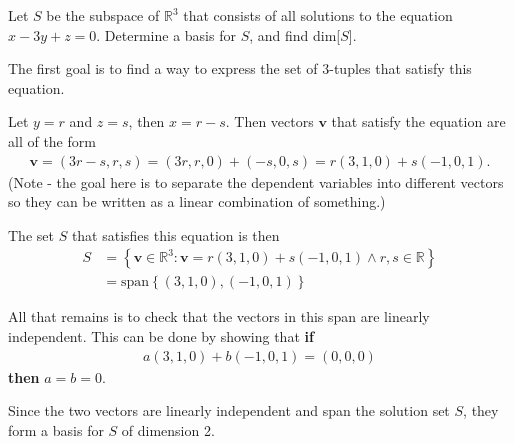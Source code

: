\begin{problem}[?]

Let \(S\) be the subspace of \(\mathbb{R}^3\) that consists of all
solutions to the equation \(x-3y+z = 0\). Determine a basis for \(S\),
and find dim{[}\(S\){]}.

\end{problem}

\begin{solution}

The first goal is to find a way to express the set of 3-tuples that
satisfy this equation.

Let \(y=r\) and \(z=s\), then \(x=r-s\). Then vectors \(\mathbf{v}\)
that satisfy the equation are all of the form
\begin{align*}
\mathbf{v} = (3r-s, r, s) = (3r,r,0)+(-s,0,s) = r(3,1,0) + s(-1,0,1).
\end{align*} (Note - the goal here is to separate the dependent
variables into different vectors so they can be written as a linear
combination of something.)

The set \(S\) that satisfies this equation is then
\begin{align*}
S &= \left\{ \mathbf{v} \in \mathbb{R}^3 : \mathbf{v} =r(3,1,0) + s(-1,0,1) \land r,s\in\mathbb{R} \right\} \\
&= \text{span}\left\{ (3,1,0), (-1,0,1)\right\}
\end{align*}

All that remains is to check that the vectors in this span are linearly
independent. This can be done by showing that \textbf{if}
\begin{align*}
a(3,1,0) + b(-1,0,1) = (0,0,0)
\end{align*} \textbf{then} \(a=b=0\).

Since the two vectors are linearly independent and span the solution set
\(S\), they form a basis for \(S\) of dimension 2.

\end{solution}

